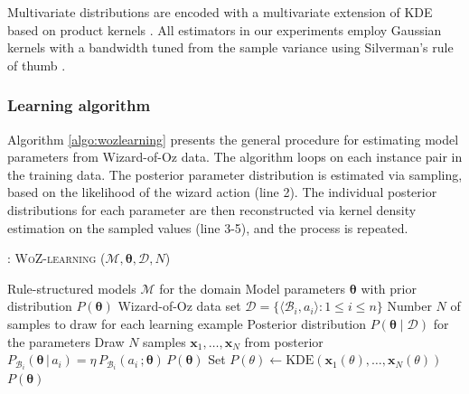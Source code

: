Multivariate distributions are encoded with a multivariate extension of KDE based on product kernels \citep{Silverman1986}.  All estimators in our experiments employ Gaussian kernels with a bandwidth tuned from the sample variance using Silverman's rule of thumb \citep{Silverman1986}. 


\subsubsection*{Learning algorithm}

Algorithm \ref{algo:wozlearning} presents the general procedure for estimating model parameters from Wizard-of-Oz data.  The algorithm loops on each instance pair in the training data.   The posterior parameter distribution is estimated via sampling, based on the likelihood of the wizard action (line 2).  The individual posterior distributions for each parameter are then reconstructed via kernel density estimation on the sampled values (line 3-5), and the process is repeated. 


\begin{algorithm}[h!]
\caption{: \textsc{WoZ-learning} ($\mathcal{M}, \boldsymbol\theta, \mathcal{D}, N$)}
\begin{algorithmic}[1] \vspace{1mm}
\REQUIRE Rule-structured models $\mathcal{M}$ for the domain
\REQUIRE Model parameters $\boldsymbol\theta$ with prior distribution $P(\boldsymbol\theta)$
\REQUIRE Wizard-of-Oz data set $\mathcal{D} = \{\langle \mathcal{B}_i, a_i \rangle : 1 \leq i  \leq n\}$
\REQUIRE Number $N$ of samples to draw for each learning example
\ENSURE Posterior distribution $P(\boldsymbol\theta \; | \; \mathcal{D})$ for the parameters  \vspace{1mm}
\STATE Draw $N$ samples $\mathbf{x}_1, \dots, \mathbf{x}_N$ from posterior $P_{\mathcal{B}_i}(\boldsymbol\theta \, | \, a_i) = \eta \, P_{\mathcal{B}_i}(a_i\,; \boldsymbol\theta) \, P(\boldsymbol\theta )$
\STATE Set $P(\theta) \leftarrow \mathrm{KDE}(\mathbf{x}_1(\theta), \dots, \mathbf{x}_N(\theta))$
\ENDFOR
\ENDFOR
\RETURN $P(\boldsymbol\theta)$
\end{algorithmic}
\label{algo:wozlearning}
\end{algorithm}


